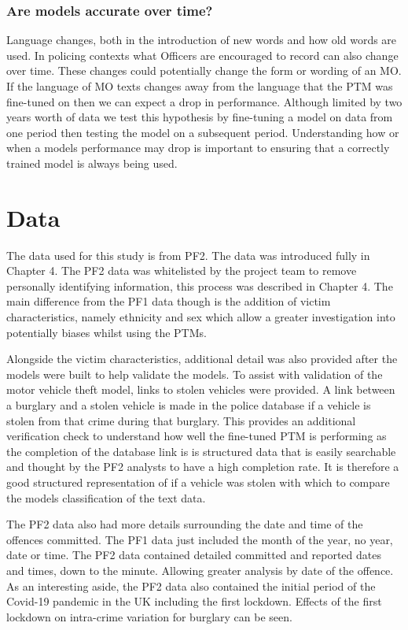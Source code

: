 \subsubsection{Are models accurate over time?} Language changes, both in the introduction of new words and how old words are used. In policing contexts what Officers are encouraged to record can also change over time. These changes could potentially change the form or wording of an MO.  If the language of MO texts changes away from the language that the PTM was fine-tuned on then we can expect a drop in performance. Although limited by two years worth of data we test this hypothesis by fine-tuning a model on data from one period then testing the model on a subsequent period. Understanding how or when a models performance may drop is important to ensuring that a correctly trained model is always being used.

\section{Data} The data used for this study is from PF2. The data was introduced fully in Chapter 4. The PF2 data was whitelisted by the project team to remove personally identifying information, this process was described in Chapter 4. The main difference from the PF1 data though is the addition of victim characteristics, namely ethnicity and sex which allow a greater investigation into potentially biases whilst using the PTMs. 

Alongside the victim characteristics, additional detail was also provided after the models were built to help validate the models. To assist with validation of the motor vehicle theft model, links to stolen vehicles were provided. A link between a burglary and a stolen vehicle is made in the police database if a vehicle is stolen from that crime during that burglary. This provides an additional verification check to understand how well the fine-tuned PTM is performing as the completion of the database link is is structured data that is easily searchable and thought by the PF2 analysts to have a high completion rate. It is therefore a good structured representation of if a vehicle was stolen with which to compare the models classification of the text data.

The PF2 data also had more details surrounding the date and time of the offences committed. The PF1 data just included the month of the year, no year, date or time. The PF2 data contained detailed committed and reported dates and times, down to the minute. Allowing greater analysis by date of the offence. As an interesting aside, the PF2 data also contained the initial period of the Covid-19 pandemic in the UK including the first lockdown. Effects of the first lockdown on intra-crime variation for burglary can be seen.   


